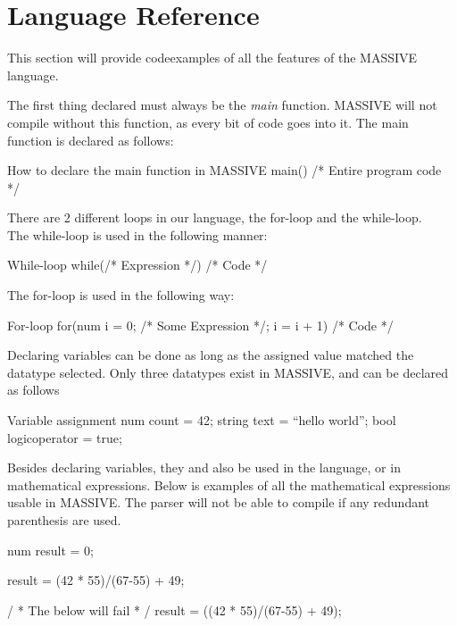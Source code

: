 \section{Language Reference}
\label{sec:language_reference}

This section will provide codeexamples of all the features of the MASSIVE language.

The first thing declared must always be the \textit{main} function. MASSIVE will not compile without this function, as every bit of code goes into it.
The main function is declared as follows:

\begin{source}{How to declare the main function in MASSIVE}{}
main()
{
		/* Entire program code */
}
\end{source}

There are 2 different loops in our language, the for-loop and the while-loop.\\
The while-loop is used in the following manner:
\begin{source}{While-loop}{}
while(/* Expression */)
{
		/* Code */
}
\end{source}

The for-loop is used in the following way:
\begin{source}{For-loop}{}
for(num i = 0; /* Some Expression */; i = i + 1)
{
		/* Code */
}
\end{source}

Declaring variables can be done as long as the assigned value matched the datatype selected. Only three datatypes exist in MASSIVE, and can be declared as follows

\begin{source}{Variable assignment}{}
num count = 42;
string text = ``hello world'';
bool logicoperator = true;
\end{source}

Besides declaring variables, they and also be used in the language, or in mathematical expressions. Below is examples of all the mathematical expressions usable in MASSIVE. The parser will not be able to compile if any redundant parenthesis are used.

\begin{source}{}{}
num result = 0;

result = (42 * 55)/(67-55) + 49;

/ * The below will fail * /
result = ((42 * 55)/(67-55) + 49);

\end{source}


